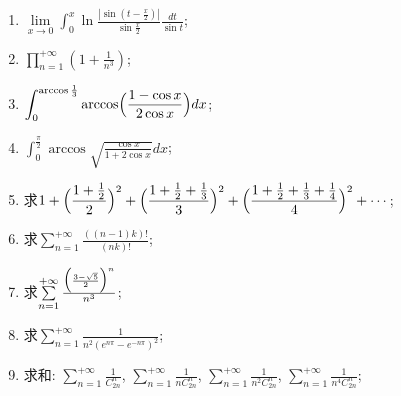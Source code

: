 \documentclass[12pt,a4paper,openany]{book}
\begin{document}
\begin{enumerate}
\item $\displaystyle\lim\limits_{x \rightarrow 0}{\int_{0}^{x}{\ln{\frac{|\sin(t - \frac{x}{2})|}{\sin{\frac{x}{2}}}}\frac{dt}{\sin{t}}}}$;

\item $\displaystyle\prod\limits_{n=1}^{+\infty}{(1 + \frac{1}{n^3})}$;

\item $\displaystyle\int_{0}^{\arccos{\frac{1}{3}}}{\arccos\Bigl{(} \frac{1 - \cos{x}}{2\cos{x}} \Bigr{)}dx}$;

\item $\displaystyle\int_{0}^{\frac{\pi}{2}}{\arccos\sqrt{ \frac{\cos{x}}{1 + 2\cos{x}} }dx}$;

\item 求$1 + \displaystyle\Bigl{(} \frac{1 + \frac{1}{2}}{2} \Bigr{)}^2 + \Bigl{(} \frac{1 + \frac{1}{2} + \frac{1}{3}}{3} \Bigr{)}^2 + \Bigl{(} \frac{1 + \frac{1}{2} + \frac{1}{3} + \frac{1}{4}}{4} \Bigr{)}^2 + \cdots$;

\item 求$\sum\limits_{n=1}^{+\infty}{\displaystyle\frac{((n-1)k)!}{(nk)!}}$;

\item 求$\sum\limits_{n=1}^{+\infty}{\frac{\Bigl{(} \frac{3 - \sqrt{5}}{2} \Bigr{)}^n}{n^3}}$;

\item 求$\sum\limits_{n=1}^{+\infty}{\displaystyle\frac{1}{n^2(e^{n\pi} - e^{-n\pi})^2}}$;

\item 求和: $\sum\limits_{n=1}^{+\infty}{\displaystyle\frac{1}{C_{2n}^{n}}}$, $\sum\limits_{n=1}^{+\infty}{\displaystyle\frac{1}{nC_{2n}^{n}}}$, $\sum\limits_{n=1}^{+\infty}{\displaystyle\frac{1}{n^2C_{2n}^{n}}}$, $\sum\limits_{n=1}^{+\infty}{\displaystyle\frac{1}{n^4C_{2n}^{n}}}$;

\end{enumerate}
\end{document}
